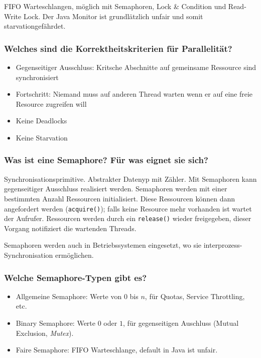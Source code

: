 \documentclass[10pt,a4paper]{scrartcl}
\begin{document}
FIFO Warteschlangen, möglich mit Semaphoren, Lock \& Condition und Read-Write Lock. Der Java
Monitor ist grundlätzlich unfair und somit starvationgefährdet.

\subsubsection{Welches sind die Korrektheitskriterien für Parallelität?}

\begin{itemize}
	\item Gegenseitiger Ausschluss: Kritsche Abschnitte auf gemeinsame Ressource sind
		synchronisiert
	\item Fortschritt: Niemand muss auf anderen Thread warten wenn er auf eine freie Resource
		zugreifen will
	\item Keine Deadlocks
	\item Keine Starvation
\end{itemize}

\subsubsection{Was ist eine Semaphore? Für was eignet sie sich?}

Synchronisationsprimitive. Abstrakter Datenyp mit Zähler. Mit Semaphoren kann gegenseitiger
Ausschluss realisiert werden. Semaphoren werden mit einer bestimmten Anzahl Ressourcen
initialisiert. Diese Ressourcen können dann angefordert werden (\texttt{acquire()}); falls keine
Resource mehr vorhanden ist wartet der Aufrufer. Ressourcen werden durch ein \texttt{release()}
wieder freigegeben, dieser Vorgang notifiziert die wartenden Threads.  

\begin{sloppypar} %
Semaphoren werden auch in Betriebssystemen eingesetzt, wo sie interprozess-Synchronisation
ermöglichen.
\end{sloppypar}
  
\subsubsection{Welche Semaphore-Typen gibt es?}

\begin{itemize}
	\item Allgemeine Semaphore: Werte von $0$ bis $n$, für Quotas, Service Throttling, etc.
	\item Binary Semaphore: Werte $0$ oder $1$, für gegenseitigen Auschluss (Mutual Exclusion,
		\textit{Mutex}).
	\item Faire Semaphore: FIFO Warteschlange, default in Java ist unfair.
\end{itemize}
  
\end{document}
